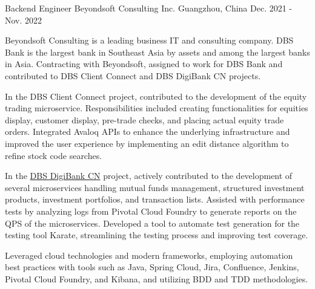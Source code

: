 \begin{cventries}
  \cventry
    {Backend Engineer} %
    {Beyondsoft Consulting Inc.} %
    {Guangzhou, China} %
    {Dec. 2021 - Nov. 2022} %
    {
      \begin{cvitems} %
        \item {Beyondsoft Consulting is a leading business IT and consulting company. DBS Bank is the largest bank in Southeast Asia by assets and among the largest banks in Asia. Contracting with Beyondsoft, assigned to work for DBS Bank and contributed to DBS Client Connect and DBS DigiBank CN projects.}
        \item {In the DBS Client Connect project, contributed to the development of the equity trading microservice. Responsibilities included creating functionalities for equities display, customer display, pre-trade checks, and placing actual equity trade orders. Integrated Avaloq APIs to enhance the underlying infrastructure and improved the user experience by implementing an edit distance algorithm to refine stock code searches.}
        \item {In the \href{https://www.dbs.com.cn/treasures/digital-service/digibank.html}{DBS DigiBank CN} project, actively contributed to the development of several microservices handling mutual funds management, structured investment products, investment portfolios, and transaction lists. Assisted with performance tests by analyzing logs from Pivotal Cloud Foundry to generate reports on the QPS of the microservices. Developed a tool to automate test generation for the testing tool Karate, streamlining the testing process and improving test coverage.}
        \item {Leveraged cloud technologies and modern frameworks, employing automation best practices with tools such as Java, Spring Cloud, Jira, Confluence, Jenkins, Pivotal Cloud Foundry, and Kibana, and utilizing BDD and TDD methodologies.}
      \end{cvitems}
    }


\end{cventries}
